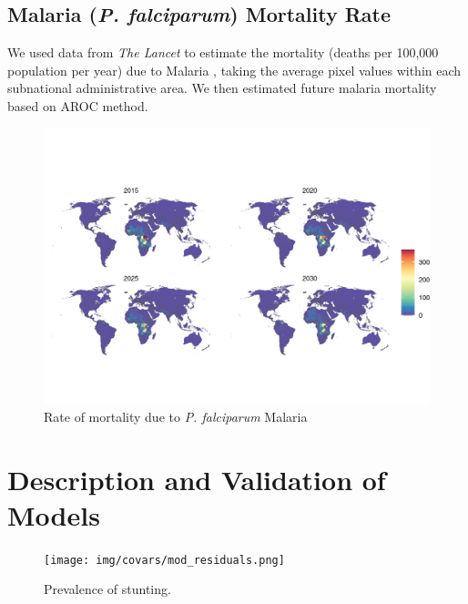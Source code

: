 \documentclass{article}
\begin{document}
\subsection{Malaria (\textit{P. falciparum}) Mortality Rate}
We used data from \textit{The Lancet} to estimate the mortality (deaths per 100,000 population per year) due to Malaria \citep{Weiss2019}, taking the average pixel values within each subnational administrative area.  We then estimated future malaria mortality based on AROC method.

\begin{figure}[H]
  \centering
  \includegraphics[width=\linewidth]{img/covars/mal_falciparum.png}
  \caption{Rate of mortality due to \textit{P. falciparum} Malaria}
\end{figure}

\section{Description and Validation of Models}


\begin{figure}[H]
  \centering
  \texttt{[image: img/covars/mod\_residuals.png]}
  \caption{Prevalence of stunting.}
\end{figure}
\end{document}

